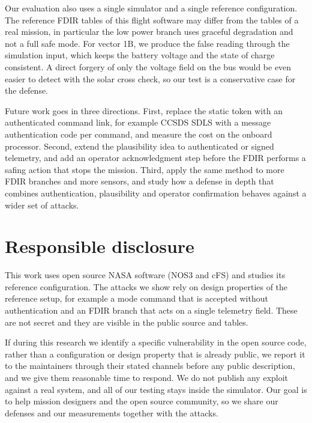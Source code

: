 \documentclass[conference,letterpaper,10pt]{IEEEtran}
\begin{document}
Our evaluation also uses a single simulator and a single reference configuration. The reference FDIR tables of this flight software may differ from the tables of a real mission, in particular the low power branch uses graceful degradation and not a full safe mode. For vector 1B, we produce the false reading through the simulation input, which keeps the battery voltage and the state of charge consistent. A direct forgery of only the voltage field on the bus would be even easier to detect with the solar cross check, so our test is a conservative case for the defense.

Future work goes in three directions. First, replace the static token with an authenticated command link, for example CCSDS SDLS with a message authentication code per command, and measure the cost on the onboard processor. Second, extend the plausibility idea to authenticated or signed telemetry, and add an operator acknowledgment step before the FDIR performs a safing action that stops the mission. Third, apply the same method to more FDIR branches and more sensors, and study how a defense in depth that combines authentication, plausibility and operator confirmation behaves against a wider set of attacks.

\section{Responsible disclosure}
\label{sec:disclosure}
This work uses open source NASA software (NOS3 and cFS) and studies its reference configuration. The attacks we show rely on design properties of the reference setup, for example a mode command that is accepted without authentication and an FDIR branch that acts on a single telemetry field. These are not secret and they are visible in the public source and tables.

If during this research we identify a specific vulnerability in the open source code, rather than a configuration or design property that is already public, we report it to the maintainers through their stated channels before any public description, and we give them reasonable time to respond. We do not publish any exploit against a real system, and all of our testing stays inside the simulator. Our goal is to help mission designers and the open source community, so we share our defenses and our measurements together with the attacks.
\end{document}
